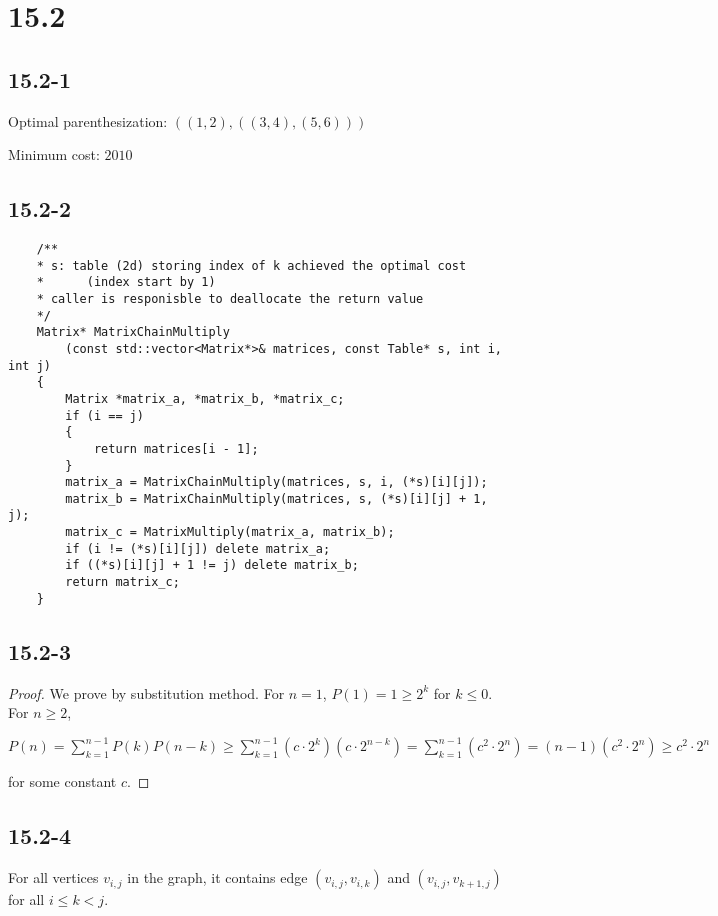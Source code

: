 \section*{15.2}

\subsection*{15.2-1}

Optimal parenthesization: $((1,2),((3,4),(5,6)))$

Minimum cost: $2010$

\subsection*{15.2-2}

\begin{verbatim}
    /**
    * s: table (2d) storing index of k achieved the optimal cost 
    *      (index start by 1)
    * caller is responisble to deallocate the return value
    */
    Matrix* MatrixChainMultiply
        (const std::vector<Matrix*>& matrices, const Table* s, int i, int j)
    {
        Matrix *matrix_a, *matrix_b, *matrix_c;
        if (i == j)
        {
            return matrices[i - 1];
        }
        matrix_a = MatrixChainMultiply(matrices, s, i, (*s)[i][j]);
        matrix_b = MatrixChainMultiply(matrices, s, (*s)[i][j] + 1, j);
        matrix_c = MatrixMultiply(matrix_a, matrix_b);
        if (i != (*s)[i][j]) delete matrix_a;
        if ((*s)[i][j] + 1 != j) delete matrix_b;
        return matrix_c;
    }
\end{verbatim}

\subsection*{15.2-3}

\begin{proof}
    \noindent
    We prove by substitution method.
    For $n=1$, $P(1)=1 \geq 2^k$ for $k\leq 0$.
    For $n \geq 2$,

    $P(n) = \sum\limits_{k=1}^{n-1}P(k)P(n-k)
    \geq \sum\limits_{k=1}^{n-1}(c \cdot 2^k)(c \cdot 2^{n-k})
    = \sum\limits_{k=1}^{n-1}(c^2 \cdot 2^n)
    = (n-1)(c^2 \cdot 2^n)
    \geq c^2 \cdot 2^n$

    \noindent
    for some constant $c$.
\end{proof}

\subsection*{15.2-4}
\noindent
For all vertices $v_{i,j}$ in the graph, 
it contains edge $(v_{i,j}, v_{i,k})$ and $(v_{i,j}, v_{k+1,j})$
for all $i \leq k < j$.

